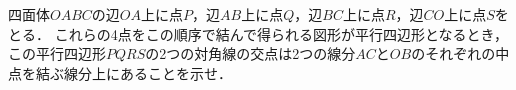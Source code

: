 \documentclass[../../main.tex]{subfiles}
\begin{document}
四面体$OABC$の辺$OA$上に点$P$，辺$AB$上に点$Q$，辺$BC$上に点$R$，辺$CO$上に点$S$をとる．
これらの4点をこの順序で結んで得られる図形が平行四辺形となるとき，
この平行四辺形$PQRS$の2つの対角線の交点は2つの線分$AC$と$OB$のそれぞれの中点を結ぶ線分上にあることを示せ．
\end{document}
